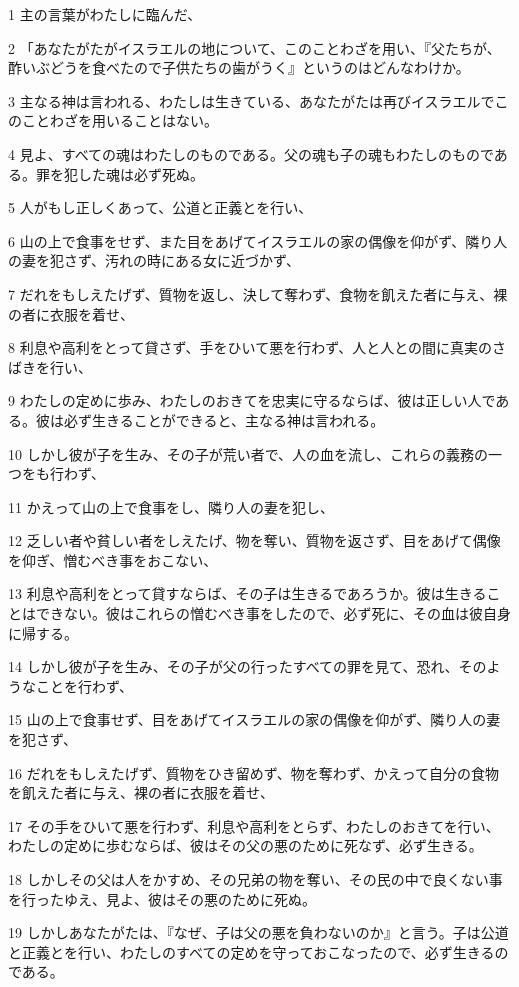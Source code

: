 \par 1 主の言葉がわたしに臨んだ、
\par 2 「あなたがたがイスラエルの地について、このことわざを用い、『父たちが、酢いぶどうを食べたので子供たちの歯がうく』というのはどんなわけか。
\par 3 主なる神は言われる、わたしは生きている、あなたがたは再びイスラエルでこのことわざを用いることはない。
\par 4 見よ、すべての魂はわたしのものである。父の魂も子の魂もわたしのものである。罪を犯した魂は必ず死ぬ。
\par 5 人がもし正しくあって、公道と正義とを行い、
\par 6 山の上で食事をせず、また目をあげてイスラエルの家の偶像を仰がず、隣り人の妻を犯さず、汚れの時にある女に近づかず、
\par 7 だれをもしえたげず、質物を返し、決して奪わず、食物を飢えた者に与え、裸の者に衣服を着せ、
\par 8 利息や高利をとって貸さず、手をひいて悪を行わず、人と人との間に真実のさばきを行い、
\par 9 わたしの定めに歩み、わたしのおきてを忠実に守るならば、彼は正しい人である。彼は必ず生きることができると、主なる神は言われる。
\par 10 しかし彼が子を生み、その子が荒い者で、人の血を流し、これらの義務の一つをも行わず、
\par 11 かえって山の上で食事をし、隣り人の妻を犯し、
\par 12 乏しい者や貧しい者をしえたげ、物を奪い、質物を返さず、目をあげて偶像を仰ぎ、憎むべき事をおこない、
\par 13 利息や高利をとって貸すならば、その子は生きるであろうか。彼は生きることはできない。彼はこれらの憎むべき事をしたので、必ず死に、その血は彼自身に帰する。
\par 14 しかし彼が子を生み、その子が父の行ったすべての罪を見て、恐れ、そのようなことを行わず、
\par 15 山の上で食事せず、目をあげてイスラエルの家の偶像を仰がず、隣り人の妻を犯さず、
\par 16 だれをもしえたげず、質物をひき留めず、物を奪わず、かえって自分の食物を飢えた者に与え、裸の者に衣服を着せ、
\par 17 その手をひいて悪を行わず、利息や高利をとらず、わたしのおきてを行い、わたしの定めに歩むならば、彼はその父の悪のために死なず、必ず生きる。
\par 18 しかしその父は人をかすめ、その兄弟の物を奪い、その民の中で良くない事を行ったゆえ、見よ、彼はその悪のために死ぬ。
\par 19 しかしあなたがたは、『なぜ、子は父の悪を負わないのか』と言う。子は公道と正義とを行い、わたしのすべての定めを守っておこなったので、必ず生きるのである。
